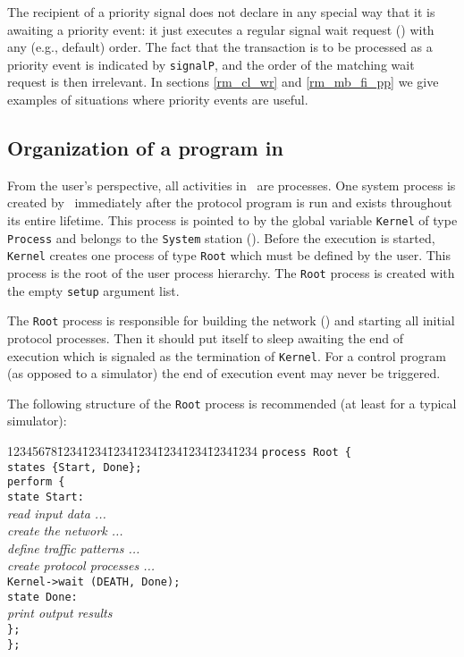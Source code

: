The recipient of a priority signal
does not declare in any special way that it is awaiting a priority event:
it just executes a regular signal wait request () with
any (e.g., default) order.
The fact that the transaction is to be processed as a
priority event is indicated by {\tt signalP}, and the order of the matching
wait request is then irrelevant.
In sections \ref{rm_cl_wr} and \ref{rm_mb_fi_pp} we give examples of situations
where priority events are useful.

\subsection{Organization of a program in \smurph}
\label{rm_pr_or}

From the user's perspective, all activities in \smurph\ are processes.
One system process is created by \smurph\ immediately
after the protocol program is run
and exists throughout its entire lifetime.
This process is pointed to by the global variable {\tt Kernel} of type
{\tt Process} and belongs to the {\tt System} station ().
Before the execution is started, {\tt Kernel} creates one process of type
{\tt Root} which must be defined by the user.
This process is the root of the user process hierarchy.
The {\tt Root} process is created with the empty {\tt setup} argument list.

The {\tt Root} process is responsible for building the network ()
and starting all initial protocol processes.
Then it should put itself to sleep awaiting the end of execution which
is signaled as the termination of {\tt Kernel}.
For a control program (as opposed to a simulator) the end of execution event
may never be triggered.

The following structure of the {\tt Root} process is recommended (at least
for a typical simulator):
{\tt\begin{tabbing}
12345678\=1234\=1234\=1234\=1234\=1234\=1234\=1234\=1234\kill
\> {\tt process Root \{} \\
\> \> {\tt states \{Start, Done\};} \\
\> \> {\tt perform \{} \\
\> \> \> {\tt state Start:} \\
\> \> \> \> {\em read input data ...} \\
\> \> \> \> {\em create the network ...} \\
\> \> \> \> {\em define traffic patterns ...} \\
\> \> \> \> {\em create protocol processes ...} \\
\> \> \> \> {\tt Kernel->wait (DEATH, Done);} \\
\> \> \> {\tt state Done:} \\
\> \> \> \> {\em print output results} \\
\> \> {\tt \};} \\
\> {\tt \};}
\end{tabbing}}

